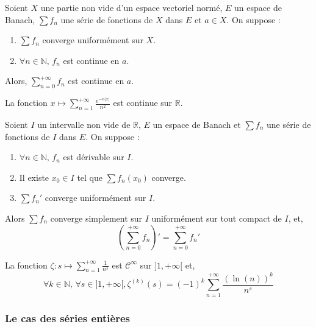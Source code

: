   \begin{theorem}
    Soient $X$ une partie non vide d'un espace vectoriel normé, $E$ un espace de Banach, $\sum f_n$ une série de fonctions de $X$ dans $E$ et $a \in X$. On suppose :
    \begin{enumerate}[label={\bfseries(\roman*)}]
      \item $\sum f_n$ converge uniformément sur $X$.
      \item $\forall n \in \mathbb{N}, \, f_n$ est continue en $a$.
    \end{enumerate}
    Alors, $\sum_{n=0}^{+\infty} f_n$ est continue en $a$.
  \end{theorem}

  \begin{example}
    La fonction $x \mapsto \sum_{n=1}^{+\infty} \frac{e^{-n\vert x \vert}}{n^2}$ est continue sur $\mathbb{R}$.
  \end{example}

  \begin{theorem}
    Soient $I$ un intervalle non vide de $\mathbb{R}$, $E$ un espace de Banach et $\sum f_n$ une série de fonctions de $I$ dans $E$. On suppose :
    \begin{enumerate}[label={\bfseries(\roman*)}]
      \item $\forall n \in \mathbb{N}, \, f_n$ est dérivable sur $I$.
      \item Il existe $x_0 \in I$ tel que $\sum f_n(x_0)$ converge.
      \item $\sum f_n'$ converge uniformément sur $I$.
    \end{enumerate}
    Alors $\sum f_n$ converge simplement sur $I$ uniformément sur tout compact de $I$, et,
    \[ \left( \sum_{n=0}^{+\infty} f_n \right)' = \sum_{n=0}^{+\infty} f_n' \]
  \end{theorem}

  \begin{example}
    La fonction $\zeta : s \mapsto \sum_{n=1}^{+\infty} \frac{1}{n^s}$ est $\mathcal{C}^\infty$ sur $]1, +\infty[$ et,
    \[ \forall k \in \mathbb{N}, \, \forall s \in ]1, +\infty[, \zeta^{(k)}(s) = (-1)^k \sum_{n=1}^{+\infty} \frac{(\ln(n))^k}{n^s} \]
  \end{example}

  \subsubsection{Le cas des séries entières}


